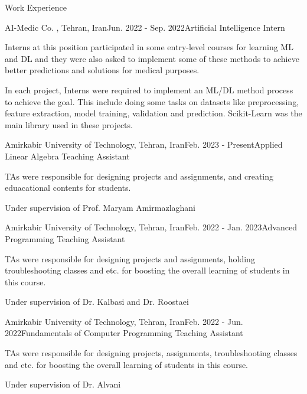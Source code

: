 \documentclass{resume}
\begin{document}
\begin{rSection}{Work Experience}
    \begin{rSubsection}{AI-Medic Co. , Tehran, Iran}{Jun. 2022 - Sep. 2022}{Artificial Intelligence Intern}{}
     \item Interns at this position participated in some entry-level courses for learning ML and DL and 
     they were also asked to implement some of these methods to achieve better predictions and solutions 
     for medical purposes.
     \item In each project, Interns were required to implement an ML/DL method process to achieve the goal. This 
     include doing some tasks on datasets like preprocessing, feature extraction, model training, validation and prediction. 
     Scikit-Learn was the main library used in these projects.  
    \end{rSubsection}

\newpage

    \begin{rSubsection}{Amirkabir University of Technology, Tehran, Iran}{Feb. 2023 - Present}{Applied Linear Algebra Teaching Assistant}{}
     \item TAs were responsible for designing projects and assignments, and creating eduacational contents for students.
     \item Under supervision of Prof. Maryam Amirmazlaghani
    \end{rSubsection}

    \begin{rSubsection}{Amirkabir University of Technology, Tehran, Iran}{Feb. 2022 - Jan. 2023}{Advanced Programming Teaching Assistant}{}
     \item TAs were responsible for designing projects and assignments, holding troubleshooting classes and etc. for boosting the overall learning of 
     students in this course.
     \item Under supervision of Dr. Kalbasi and Dr. Roostaei 
    \end{rSubsection}

    \begin{rSubsection}{Amirkabir University of Technology, Tehran, Iran}{Feb. 2022 - Jun. 2022}{Fundamentals of Computer Programming Teaching Assistant}{}
     \item TAs were responsible for designing projects, assignments, troubleshooting classes and etc. for boosting the overall learning of 
     students in this course.
     \item Under supervision of Dr. Alvani
    \end{rSubsection}

\end{rSection}
\end{document}
